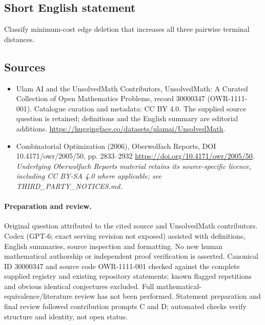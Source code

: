 \documentclass[11pt]{article}
\begin{document}
\subsection{Short English statement}
Classify minimum-cost edge deletion that increases all three pairwise terminal distances.
\subsection{Sources}
\begin{itemize}
\item[\hypertarget{source:30000347:1}{S1}] Ulam AI and the UnsolvedMath Contributors, UnsolvedMath: A Curated Collection of Open Mathematics Problems, record 30000347 (OWR-1111-001). Catalogue curation and metadata: CC BY 4.0. The supplied source question is retained; definitions and the English summary are editorial additions.
\url{https://huggingface.co/datasets/ulamai/UnsolvedMath}.
\item[\hypertarget{source:30000347:2}{S2}] Combinatorial Optimization (2006), Oberwolfach Reports, DOI 10.4171/owr/2005/50, pp. 2833--2932
\url{https://doi.org/10.4171/owr/2005/50}.
\textit{Underlying Oberwolfach Reports material retains its source-specific licence, including CC BY-SA 4.0 where applicable; see THIRD\_PARTY\_NOTICES.md.}
\end{itemize}
\paragraph{Preparation and review.}
Original question attributed to the cited source and UnsolvedMath contributors. Codex (GPT-6; exact serving revision not exposed) assisted with definitions, English summaries, source inspection and formatting. No new human mathematical authorship or independent proof verification is asserted. Canonical ID 30000347 and source code OWR-1111-001 checked against the complete supplied registry and existing repository statements; known flagged repetitions and obvious identical conjectures excluded. Full mathematical-equivalence/literature review has not been performed. Statement preparation and final review followed contribution prompts C and D; automated checks verify structure and identity, not open status.
\label{end:30000347}
\end{document}
